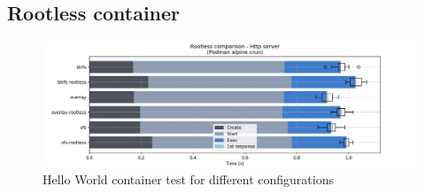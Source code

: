 \clearpage
\subsection{Rootless container}

\begin{figure}[h!]
  \begin{center}
    \includegraphics[width=\linewidth]{images/rootless/rootless-Http-server-Podman-alpine-crun.png}
    \caption{Hello World container test for different configurations}
    \label{fig:rootless:hello-world}
  \end{center}
\end{figure}

